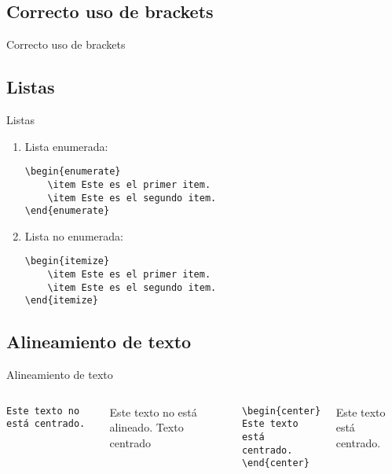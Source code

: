 \documentclass[../slides.tex]{subfiles}
\begin{document}
    \subsection{Correcto uso de brackets}
    \begin{frame}{Correcto uso de brackets}
    
    \end{frame}
    
    \subsection{Listas}
    \begin{frame}[fragile]{Listas}
        \begin{enumerate}
            \item Lista enumerada:
                \begin{verbatim}
\begin{enumerate}
    \item Este es el primer item.
    \item Este es el segundo item.
\end{enumerate}
                \end{verbatim}
            \item Lista no enumerada:
                \begin{verbatim}
\begin{itemize}
    \item Este es el primer item.
    \item Este es el segundo item.
\end{itemize}
                \end{verbatim}
        \end{enumerate}
    \end{frame}
    
    \subsection{Alineamiento de texto}
    \begin{frame}[fragile]{Alineamiento de texto}
        \begin{columns}
                \begin{verbatim}
Este texto no está centrado.
                \end{verbatim}
Este texto no está alineado.
                Texto centrado
                    \begin{verbatim}
\begin{center}
Este texto está centrado.
\end{center}
                    \end{verbatim}
\begin{center}
Este texto está centrado.
\end{center}
        \end{columns}
    \end{frame}
\end{document}
